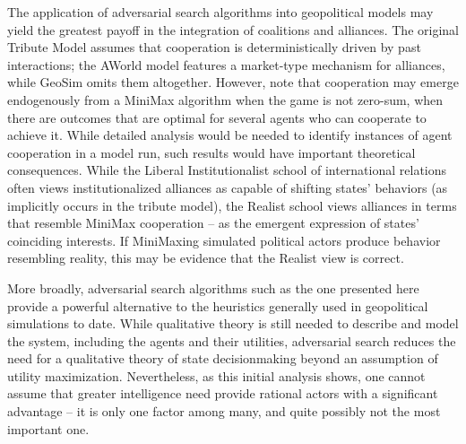 \documentclass{article}
\begin{document}
The application of adversarial search algorithms into geopolitical models may yield the greatest payoff in the integration of coalitions and alliances. The original Tribute Model assumes that cooperation is deterministically driven by past interactions; the AWorld \citep{min_2002} model features a market-type mechanism for alliances, while GeoSim \citep{cederman_2003} omits them altogether. However, \citet{russell_2009} note that cooperation may emerge endogenously from a MiniMax algorithm when the game is not zero-sum, when there are outcomes that are optimal for several agents who can cooperate to achieve it. While detailed analysis would be needed to identify instances of agent cooperation in a model run, such results would have important theoretical consequences. While the Liberal Institutionalist school of international relations often views institutionalized alliances as capable of shifting states' behaviors (as implicitly occurs in the tribute model), the Realist school \citep{mearsheimer_1995} views alliances in terms that resemble MiniMax cooperation -- as the emergent expression of states' coinciding interests. If MiniMaxing simulated political actors produce behavior resembling reality, this may be evidence that the Realist view is correct. 

More broadly, adversarial search algorithms such as the one presented here provide a powerful alternative to the heuristics generally used in geopolitical simulations to date. While qualitative theory is still needed to describe and model the system, including the agents and their utilities, adversarial search reduces the need for a qualitative theory of state decisionmaking beyond an assumption of utility maximization. Nevertheless, as this initial analysis shows, one cannot assume that greater intelligence need provide rational actors with a significant advantage -- it is only one factor among many, and quite possibly not the most important one.





\end{document}
